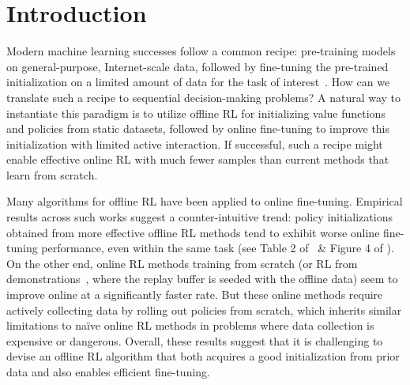 \vspace{-0.2cm}
\section{Introduction}
\label{sec:calql_introduction}
\vspace{-0.2cm}

Modern machine learning successes follow a common recipe: pre-training models on general-purpose, Internet-scale data, followed by fine-tuning the pre-trained initialization on a limited amount of data for the task of interest~\cite{he2022masked,devlin2018bert}. How can we translate such a recipe to sequential decision-making problems? A natural way to instantiate this paradigm is to utilize offline RL for initializing value functions and policies from static datasets, followed by online fine-tuning to improve this initialization with limited active interaction. If successful, such a recipe might enable effective online RL with much fewer samples than current methods that learn from scratch.

Many algorithms for offline RL have been applied to online fine-tuning. Empirical results across such works suggest a counter-intuitive trend: policy initializations obtained from more effective offline RL methods tend to exhibit worse online fine-tuning performance, even within the same task (see Table 2 of~\cite{kostrikov2021offline} \& Figure 4 of \cite{xiao2023the}). On the other end, online RL methods training from scratch (or RL from demonstrations~\cite{vecerik2017leveraging},
where the replay buffer is seeded with the offline data) seem to improve online at a significantly faster rate. But these online methods require actively collecting data by rolling out policies from scratch, which inherits similar limitations to na\"ive online RL methods in problems where data collection is expensive or dangerous. Overall, these results suggest that it is challenging to devise an offline RL algorithm that both acquires a good initialization from prior data and also enables efficient fine-tuning.

